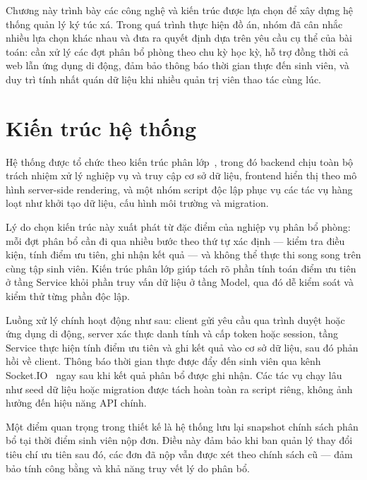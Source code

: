 \documentclass[../DoAn.tex]{subfiles}
\begin{document}
\sloppy

Chương này trình bày các công nghệ và kiến trúc được lựa chọn để xây dựng hệ
thống quản lý ký túc xá. Trong quá trình thực hiện đồ án, nhóm đã cân nhắc
nhiều lựa chọn khác nhau và đưa ra quyết định dựa trên yêu cầu cụ thể của bài
toán: cần xử lý các đợt phân bổ phòng theo chu kỳ học kỳ, hỗ trợ đồng thời
cả web lẫn ứng dụng di động, đảm bảo thông báo thời gian thực đến sinh viên,
và duy trì tính nhất quán dữ liệu khi nhiều quản trị viên thao tác cùng lúc.

\section{Kiến trúc hệ thống}
\label{sec:architecture}

Hệ thống được tổ chức theo kiến trúc phân lớp~\cite{fowler2002patterns}, trong
đó backend chịu toàn bộ trách nhiệm xử lý nghiệp vụ và truy cập cơ sở dữ liệu,
frontend hiển thị theo mô hình server-side rendering, và một nhóm script độc
lập phục vụ các tác vụ hàng loạt như khởi tạo dữ liệu, cấu hình môi trường
và migration.

Lý do chọn kiến trúc này xuất phát từ đặc điểm của nghiệp vụ phân bổ phòng:
mỗi đợt phân bổ cần đi qua nhiều bước theo thứ tự xác định --- kiểm tra điều
kiện, tính điểm ưu tiên, ghi nhận kết quả --- và không thể thực thi song song
trên cùng tập sinh viên. Kiến trúc phân lớp giúp tách rõ phần tính toán điểm
ưu tiên ở tầng Service khỏi phần truy vấn dữ liệu ở tầng Model, qua đó dễ
kiểm soát và kiểm thử từng phần độc lập.

Luồng xử lý chính hoạt động như sau: client gửi yêu cầu qua trình duyệt hoặc
ứng dụng di động, server xác thực danh tính và cấp token hoặc session, tầng
Service thực hiện tính điểm ưu tiên và ghi kết quả vào cơ sở dữ liệu, sau đó
phản hồi về client. Thông báo thời gian thực được đẩy đến sinh viên qua kênh
Socket.IO~\cite{socketio2024docs} ngay sau khi kết quả phân bổ được ghi nhận.
Các tác vụ chạy lâu như seed dữ liệu hoặc migration được tách hoàn toàn ra
script riêng, không ảnh hưởng đến hiệu năng API chính.

Một điểm quan trọng trong thiết kế là hệ thống lưu lại snapshot chính sách
phân bổ tại thời điểm sinh viên nộp đơn. Điều này đảm bảo khi ban quản lý
thay đổi tiêu chí ưu tiên sau đó, các đơn đã nộp vẫn được xét theo chính sách
cũ --- đảm bảo tính công bằng và khả năng truy vết lý do phân bổ.
\end{document}
